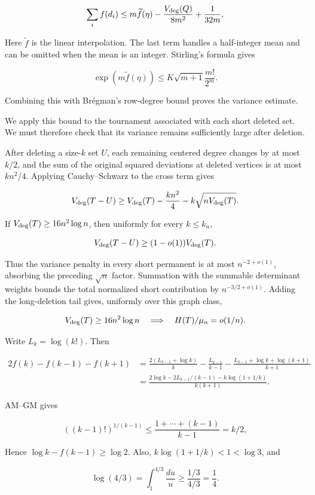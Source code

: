 \documentclass[11pt,a4paper]{article}
\begin{document}
\[
\sum_i f(d_i)
\le m\widetilde f(\eta)-\frac{V_{\rm deg}(Q)}{8m^2}+\frac{1}{32m},
\]

Here \(\widetilde f\) is the linear interpolation. The last term handles a half-integer mean and can be omitted when the mean is an integer. Stirling's formula gives

\[
\exp(m\widetilde f(\eta))\le K\sqrt{m+1}\frac{m!}{2^m}.
\]

Combining this with Brégman's row-degree bound proves the variance estimate.

We apply this bound to the tournament associated with each short deleted set. We must therefore check that its variance remains sufficiently large after deletion.

After deleting a size-\(k\) set \(U\), each remaining centered degree changes by at most \(k/2\), and the sum of the original squared deviations at deleted vertices is at most \(kn^2/4\). Applying Cauchy--Schwarz to the cross term gives

\[
V_{\rm deg}(T-U)\ge V_{\rm deg}(T)-\frac{kn^2}{4}-k\sqrt{nV_{\rm deg}(T)}.
\]

If \(V_{\rm deg}(T)\ge16n^2\log n\), then uniformly for every \(k\le k_n\),

\[
V_{\rm deg}(T-U)\ge(1-o(1))V_{\rm deg}(T).
\]

Thus the variance penalty in every short permanent is at most \(n^{-2+o(1)}\), absorbing the preceding \(\sqrt n\) factor. Summation with the summable determinant weights bounds the total normalized short contribution by \(n^{-3/2+o(1)}\). Adding the long-deletion tail gives, uniformly over this graph class,

\[
V_{\rm deg}(T)\ge16n^2\log n\quad\Longrightarrow\quad
H(T)/\mu_n=o(1/n).
\]

Write \(L_k=\log(k!)\). Then

\[
\begin{aligned}
2f(k)-f(k-1)-f(k+1)
&=\frac{2(L_{k-1}+\log k)}k-\frac{L_{k-1}}{k-1}
-\frac{L_{k-1}+\log k+\log(k+1)}{k+1}\\
&=\frac{2\log k-2L_{k-1}/(k-1)-k\log(1+1/k)}{k(k+1)}.
\end{aligned}
\]

AM--GM gives

\[
((k-1)!)^{1/(k-1)}\le\frac{1+\cdots+(k-1)}{k-1}=k/2,
\]

Hence \(\log k-f(k-1)\ge\log2\). Also, \(k\log(1+1/k)<1<\log3\), and

\[
\log(4/3)=\int_1^{4/3}\frac{du}{u}\ge\frac{1/3}{4/3}=\frac14.
\]
\end{document}
